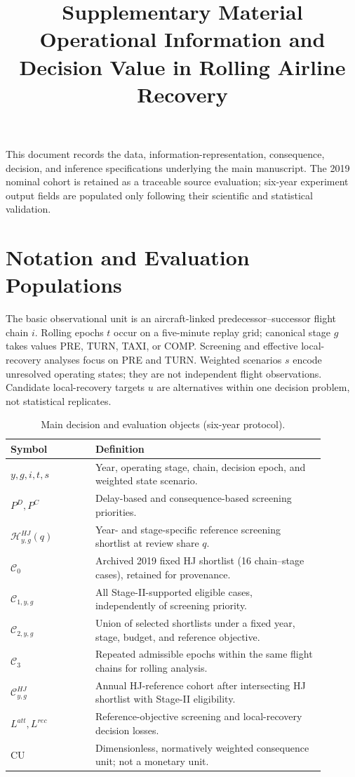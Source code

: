 \documentclass[10pt,a4paper]{article}
\author{}
\title{Supplementary Material\\[4pt]\large Operational Information and Decision Value in Rolling Airline Recovery}
\date{}
\numberwithin{equation}{section}
\begin{document}
\maketitle
\noindent This document records the data, information-representation, consequence, decision, and inference specifications underlying the main manuscript. The 2019 nominal cohort is retained as a traceable source evaluation; six-year experiment output fields are populated only following their scientific and statistical validation.
\tableofcontents

\section{Notation and Evaluation Populations}
\label{sup:notation}
The basic observational unit is an aircraft-linked predecessor--successor flight chain $i$. Rolling epochs $t$ occur on a five-minute replay grid; canonical stage $g$ takes values PRE, TURN, TAXI, or COMP. Screening and effective local-recovery analyses focus on PRE and TURN. Weighted scenarios $s$ encode unresolved operating states; they are not independent flight observations. Candidate local-recovery targets $u$ are alternatives within one decision problem, not statistical replicates.

\begin{table}[htbp]\centering\small
\caption{Main decision and evaluation objects (six-year protocol).}\label{tab:sup_notation}
\begin{tabular}{p{0.24\linewidth}p{0.65\linewidth}}\toprule
Symbol & Definition \\\midrule
$y,g,i,t,s$ & Year, operating stage, chain, decision epoch, and weighted state scenario.\\
$P^D, P^C$ & Delay-based and consequence-based screening priorities.\\
$\mathcal H^{HJ}_{y,g}(q)$ & Year- and stage-specific reference screening shortlist at review share $q$.\\
$\mathcal C_0$ & Archived 2019 fixed HJ shortlist (16 chain--stage cases), retained for provenance.\\
$\mathcal C_{1,y,g}$ & All Stage-II-supported eligible cases, independently of screening priority.\\
$\mathcal C_{2,y,g}$ & Union of selected shortlists under a fixed year, stage, budget, and reference objective.\\
$\mathcal C_{3}$ & Repeated admissible epochs within the same flight chains for rolling analysis.\\
$\mathcal C^{HJ}_{y,g}$ & Annual HJ-reference cohort after intersecting HJ shortlist with Stage-II eligibility.\\
$L^{att},L^{rec}$ & Reference-objective screening and local-recovery decision losses.\\
CU & Dimensionless, normatively weighted consequence unit; not a monetary unit.\\
\bottomrule\end{tabular}
\end{table}
\end{document}
